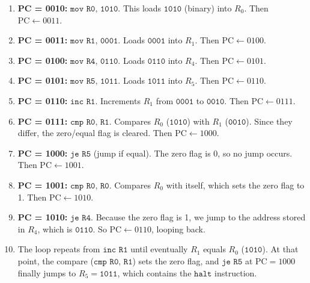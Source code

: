 \documentclass{report}
\begin{document}
\begin{enumerate}
	\item \textbf{PC = 0010:}
	      \(\texttt{mov R0, 1010}\).
	      This loads \(\texttt{1010}\) (binary) into \(R_0\).
	      Then \(\text{PC}\leftarrow 0011\).

	\item \textbf{PC = 0011:}
	      \(\texttt{mov R1, 0001}\).
	      Loads \(\texttt{0001}\) into \(R_1\).
	      Then \(\text{PC}\leftarrow 0100\).

	\item \textbf{PC = 0100:}
	      \(\texttt{mov R4, 0110}\).
	      Loads \(\texttt{0110}\) into \(R_4\).
	      Then \(\text{PC}\leftarrow 0101\).

	\item \textbf{PC = 0101:}
	      \(\texttt{mov R5, 1011}\).
	      Loads \(\texttt{1011}\) into \(R_5\).
	      Then \(\text{PC}\leftarrow 0110\).

	\item \textbf{PC = 0110:}
	      \(\texttt{inc R1}\).
	      Increments \(R_1\) from \(\texttt{0001}\) to \(\texttt{0010}\).
	      Then \(\text{PC}\leftarrow 0111\).

	\item \textbf{PC = 0111:}
	      \(\texttt{cmp R0, R1}\).
	      Compares \(R_0\) (\(\texttt{1010}\)) with \(R_1\) (\(\texttt{0010}\)).
	      Since they differ, the zero/equal flag is cleared.
	      Then \(\text{PC}\leftarrow 1000\).

	\item \textbf{PC = 1000:}
	      \(\texttt{je R5}\) (jump if equal).
	      The zero flag is 0, so no jump occurs.
	      Then \(\text{PC}\leftarrow 1001\).

	\item \textbf{PC = 1001:}
	      \(\texttt{cmp R0, R0}\).
	      Compares \(R_0\) with itself, which sets the zero flag to 1.
	      Then \(\text{PC}\leftarrow 1010\).

	\item \textbf{PC = 1010:}
	      \(\texttt{je R4}\).
	      Because the zero flag is 1, we jump to the address stored in \(R_4\),
	      which is \(\texttt{0110}\).
	      So \(\text{PC}\leftarrow 0110\), looping back.

	\item The loop repeats from \(\texttt{inc R1}\) until eventually \(R_1\)
	      equals \(R_0\) (\(\texttt{1010}\)).
	      At that point, the compare (\(\texttt{cmp R0, R1}\)) sets the zero flag,
	      and \(\texttt{je R5}\) at \(\text{PC}=1000\) finally jumps to \(R_5 = \texttt{1011}\),
	      which contains the \(\texttt{halt}\) instruction.
\end{enumerate}
\end{document}
